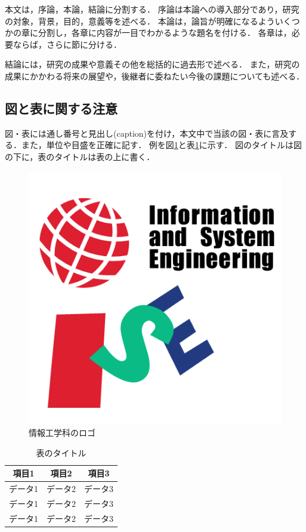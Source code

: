 \documentclass[10pt,a4paper,notitlepage,oneside,twocolumn]{abst_jsarticle}
\begin{document}
本文は，序論，本論，結論に分割する．
序論は本論への導入部分であり，研究の対象，背景，目的，意義等を述べる．
本論は，論旨が明確になるよういくつかの章に分割し，各章に内容が一目でわかるような題名を付ける．
各章は，必要ならば，さらに節に分ける．


結論には，研究の成果や意義その他を総括的に過去形で述べる．
また，研究の成果にかかわる将来の展望や，後継者に委ねたい今後の課題についても述べる．

\subsection{図と表に関する注意} \label{subsec:section22}

図・表には通し番号と見出し(caption)を付け，本文中で当該の図・表に言及する．また，単位や目盛を正確に記す．
例を図\ref{fig:logo}と表\ref{tab:}に示す．
図のタイトルは図の下に，表のタイトルは表の上に書く．


\begin{figure}[t]
    \centering
    \includegraphics[scale=0.35]{logo_color.png}
    \caption{情報工学科のロゴ}
    \label{fig:logo}
  \end{figure}

\begin {table}[t]
    \centering
  \caption{表のタイトル}
  \label{tab:}
  \begin {tabular}{ccc} \hline
     項目1 & 項目2 & 項目3 \\ \hline
    データ1 & データ2 & データ3 \\
    データ1 & データ2 & データ3 \\
    データ1 & データ2 & データ3 \\ \hline
  \end {tabular}
\end {table}
\end{document}
